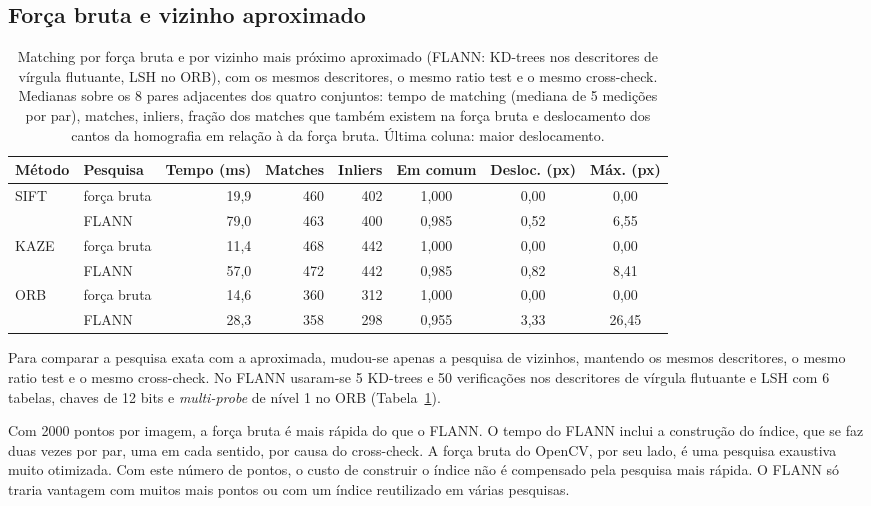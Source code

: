 \documentclass[11pt,a4paper]{article}
\begin{document}
\subsection{Força bruta e vizinho aproximado}
\begin{table}[H]
\centering\small
\caption{Matching por força bruta e por vizinho mais próximo aproximado (FLANN: KD-trees nos descritores
de vírgula flutuante, LSH no ORB), com os mesmos descritores, o mesmo ratio test e o mesmo cross-check.
Medianas sobre os 8 pares adjacentes dos quatro conjuntos: tempo de matching (mediana de 5 medições por
par), matches, inliers, fração dos matches que também existem na força bruta e deslocamento dos cantos
da homografia em relação à da força bruta. Última coluna: maior deslocamento.}
\label{tab:flann}
\begin{tabular}{llrrrccc}
\toprule
Método & Pesquisa & Tempo (ms) & Matches & Inliers & Em comum & Desloc. (px) & Máx. (px) \\
\midrule
SIFT & força bruta & 19,9 & 460 & 402 & 1,000 & 0,00 & 0,00 \\
 & FLANN & 79,0 & 463 & 400 & 0,985 & 0,52 & 6,55 \\
KAZE & força bruta & 11,4 & 468 & 442 & 1,000 & 0,00 & 0,00 \\
 & FLANN & 57,0 & 472 & 442 & 0,985 & 0,82 & 8,41 \\
ORB & força bruta & 14,6 & 360 & 312 & 1,000 & 0,00 & 0,00 \\
 & FLANN & 28,3 & 358 & 298 & 0,955 & 3,33 & 26,45 \\
\bottomrule
\end{tabular}
\end{table}

Para comparar a pesquisa exata com a aproximada, mudou-se apenas a pesquisa de vizinhos, mantendo os mesmos descritores, o mesmo ratio test e o mesmo cross-check. No FLANN usaram-se 5 KD-trees e 50 verificações nos descritores de vírgula flutuante e LSH com 6 tabelas, chaves de 12 bits e \textit{multi-probe} de nível 1 no ORB (Tabela~\ref{tab:flann}).

Com 2000 pontos por imagem, a força bruta é mais rápida do que o FLANN. O tempo do FLANN inclui a construção do índice, que se faz duas vezes por par, uma em cada sentido, por causa do cross-check. A força bruta do OpenCV, por seu lado, é uma pesquisa exaustiva muito otimizada. Com este número de pontos, o custo de construir o índice não é compensado pela pesquisa mais rápida. O FLANN só traria vantagem com muitos mais pontos ou com um índice reutilizado em várias pesquisas.
\end{document}
